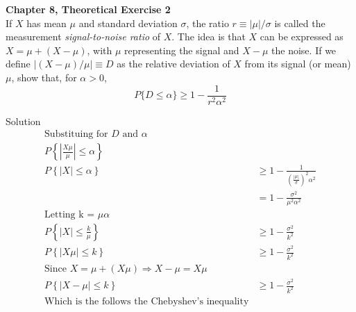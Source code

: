 \documentclass{article}
\begin{document}
\begin{spacing}{1.1}
\newpage
\begin{homeworkProblem}
  {\bf Chapter 8, Theoretical Exercise 2}\\
  If $X$ has mean $\mu$ and standard deviation $\sigma$, the ratio 
  $r \equiv |\mu|/\sigma$ is called the measurement \emph{signal-to-noise ratio} 
  of $X$. The idea is that $X$ can be expressed as $X = \mu + (X − \mu)$, with $\mu$ 
  representing the signal and $X − \mu$ the noise. If we define 
  $|(X − \mu)/\mu| \equiv D$ as the relative deviation of $X$ from its signal 
  (or mean) $\mu$, show that, for $\alpha > 0$,
    \[P\{ D \le \alpha\} \ge 1 - \frac{ 1}{ r^2 \alpha^2}\]
  \begin{homeworkSection}{Solution}
    \begin{align*}
      \text{Substituing for $D$ and $\alpha$}\\
      P\left\{ \left|\frac{ X \mu}{ \mu}\right| \le \alpha\right\} &\\
      P\left\{ \left| X\right| \le \alpha\right\} 
        &\ge 1 - \frac{ 1}{ \left(\frac{ |\mu|}{ \sigma}\right)^2 \alpha^2}\\
        &= 1 - \frac{ \sigma^2}{ \mu^2 \alpha^2}\\
      \text{Letting k = $\mu \alpha$}\\
      P\left\{ \left| X\right| \le \frac{ k}{ \mu}\right\} 
        &\ge 1 - \frac{ \sigma^2}{ k^2}\\ 
      P\left\{ \left|X \mu\right| \le k\right\} 
        &\ge 1 - \frac{ \sigma^2}{ k^2}\\ 
      \text{Since $X = \mu + (X \mu) \Rightarrow X - \mu = X\mu$}\\
      P\left\{ \left|X - \mu\right| \le k\right\} 
        &\ge 1 - \frac{ \sigma^2}{ k^2}\\ 
      \text{Which is the follows the Chebyshev's inequality}
    \end{align*}
  \end{homeworkSection}
\end{homeworkProblem}


\end{spacing}
\end{document}
